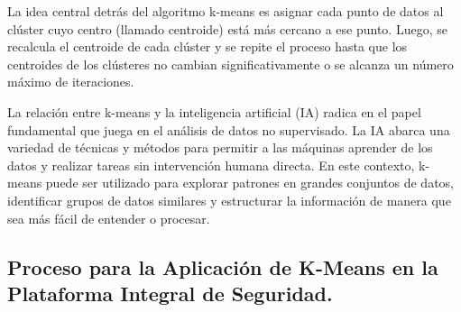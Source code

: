 \documentclass{article}
\begin{document}
    La idea central detrás del algoritmo k-means es asignar cada punto de datos al clúster cuyo centro (llamado centroide) está más cercano a ese punto. Luego, se recalcula el centroide de cada clúster y se repite el proceso hasta que los centroides de los clústeres no cambian significativamente o se alcanza un número máximo de iteraciones.

    La relación entre k-means y la inteligencia artificial (IA) radica en el papel fundamental que juega en el análisis de datos no supervisado. La IA abarca una variedad de técnicas y métodos para permitir a las máquinas aprender de los datos y realizar tareas sin intervención humana directa. En este contexto, k-means puede ser utilizado para explorar patrones en grandes conjuntos de datos, identificar grupos de datos similares y estructurar la información de manera que sea más fácil de entender o procesar.

    \subsection{Proceso para la Aplicación de K-Means en la Plataforma Integral de Seguridad.}
\end{document}
